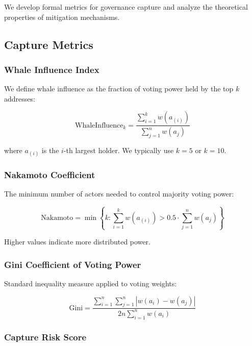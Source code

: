 
We develop formal metrics for governance capture and analyze the theoretical properties of mitigation mechanisms.

\subsection{Capture Metrics}

\subsubsection{Whale Influence Index}

We define whale influence as the fraction of voting power held by the top $k$ addresses:

\begin{equation}
\text{WhaleInfluence}_k = \frac{\sum_{i=1}^{k} w(a_{(i)})}{\sum_{j=1}^{n} w(a_j)}
\end{equation}

where $a_{(i)}$ is the $i$-th largest holder. We typically use $k=5$ or $k=10$.

\subsubsection{Nakamoto Coefficient}

The minimum number of actors needed to control majority voting power:

\begin{equation}
\text{Nakamoto} = \min \left\{ k : \sum_{i=1}^{k} w(a_{(i)}) > 0.5 \cdot \sum_{j=1}^{n} w(a_j) \right\}
\end{equation}

Higher values indicate more distributed power.

\subsubsection{Gini Coefficient of Voting Power}

Standard inequality measure applied to voting weights:

\begin{equation}
\text{Gini} = \frac{\sum_{i=1}^{n} \sum_{j=1}^{n} |w(a_i) - w(a_j)|}{2n \sum_{i=1}^{n} w(a_i)}
\end{equation}

\subsubsection{Capture Risk Score}

